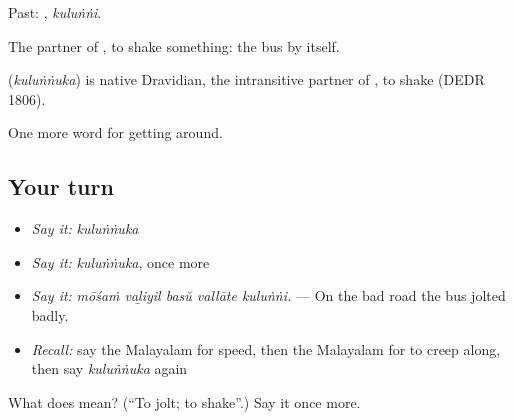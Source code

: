Past: , \emph{kuluṅṅi}.

The partner of , to shake something: the bus  by itself.

\begin{cousinweb}
\textbf{} (\emph{kuluṅṅuka}) is native Dravidian, the intransitive partner of , to shake (DEDR 1806).
\end{cousinweb}

\begin{grammarlens}[title={What you've built}]
One more word for getting around.
\end{grammarlens}

\subsection*{Your turn}
\begin{itemize}
\raggedright
  \item \emph{Say it:} \emph{kuluṅṅuka}
  \item \emph{Say it:} \emph{kuluṅṅuka}, once more
  \item \emph{Say it:} \emph{mōśaṁ vaḻiyil basŭ vallāte kuluṅṅi.} — On the bad road the bus jolted badly.
  \item \emph{Recall:} say the Malayalam for speed, then the Malayalam for to creep along, then say \emph{kuluṅṅuka} again
\end{itemize}

\begin{tcolorbox}[breakable,colback=teal!4,colframe=teal!35!black,title={Before you move on}]
What does  mean? (\textquotedblleft{}To jolt; to shake\textquotedblright{}.) Say it once more.
\end{tcolorbox}
